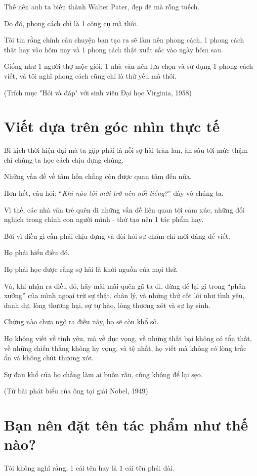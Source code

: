 \documentclass{book}
\numberwithin{equation}{section}
\begin{document}
Thế nên anh ta biến thành Walter Pater, đẹp đẽ mà rỗng tuếch.

Do đó, phong cách chỉ là 1 công cụ mà thôi.

Tôi tin rằng chính câu chuyện bạn tạo ra sẽ làm nên phong cách, 1 phong cách thật hay vào hôm nay và 1 phong cách thật xuất sắc vào ngày hôm sau.

Giống như 1 người thợ mộc giỏi, 1 nhà văn nên lựa chọn và sử dụng 1 phong cách viết, và tôi nghĩ phong cách cũng chỉ là thứ yếu mà thôi.

(Trích mục "Hỏi và đáp" với sinh viên Đại học Virginia, 1958)

\section{Viết dựa trên góc nhìn thực tế}

Bi kịch thời hiện đại mà ta gặp phải là nỗi sợ hãi tràn lan, ăn sâu tới mức thậm chí chúng ta học cách chịu đựng chúng.

Những vấn đề về tâm hồn chẳng còn được quan tâm đến nữa.

Hơn hết, câu hỏi: ``\textit{Khi nào tôi mới trở nên nổi tiếng?}'' dày vò chúng ta.

Vì thế, các nhà văn trẻ quên đi những vấn đề liên quan tới cảm xúc, những đối nghịch trong chính con người mình - thứ tạo nên 1 tác phẩm hay.

Bởi vì điều gì cần phải chịu đựng và đòi hỏi sự chăm chỉ mới đáng để viết.

%
Họ phải hiểu điều đó.

Họ phải học được rằng sợ hãi là khởi nguồn của mọi thứ.

Và, khi nhận ra điều đó, hãy mãi mãi quên gã ta đi, đừng để lại gì trong ``phân xưởng'' của mình ngoại trừ sự thật, chân lý, và những thứ cốt lõi như tình yêu, danh dự, lòng thương hại, sự tự hào, lòng thương xót và sự hy sinh.

Chừng nào chưa ngộ ra điều này, họ sẽ còn khổ sở.

Họ không viết về tình yêu, mà về dục vọng, về những thất bại không có tổn thất, về những chiến thắng không hy vọng, và tệ nhất, họ viết mà không có lòng trắc ẩn và không chút thương xót.

Sự đau khổ của họ chẳng làm ai buồn rầu, cũng không để lại sẹo.

(Từ bài phát biểu của ông tại giải Nobel, 1949)

\section{Bạn nên đặt tên tác phẩm như thế nào?}
Tôi không nghĩ rằng, 1 cái tên hay là 1 cái tên phải dài.
\end{document}
